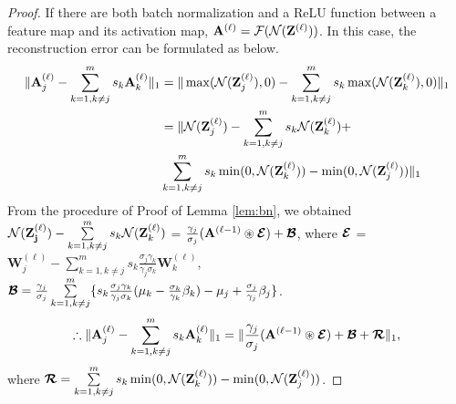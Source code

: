 \begin{proof}
If there are both batch normalization and a ReLU function between a feature map and its activation map, $\mathbf{A}^{(\ell)} = \mathcal{F}(\mathcal{N}(\mathbf{Z}^{(\ell)}))$. In this case, the reconstruction error can be formulated as below.
\small
\begin{eqnarray}
\begin{split}
 \|\mathbf{A}_{j}^{(\ell)}-\sum\limits_{k = 1, k \neq j}^{m}{s_{k}} \mathbf{A}_{k}^{(\ell)}\|_{1} &=\|\max(\mathcal{N}(\mathbf{Z}_{j}^{(\ell)}),0) - \sum\limits_{k=1, k \neq j}^{m} s_{k} \max(\mathcal{N}(\mathbf{Z}_{k}^{(\ell)}),0)\|_{1}\\
  &=\|\mathcal{N}(\mathbf{Z}_{j}^{(\ell)}) - \sum\limits_{k = 1, k \neq j}^{m}{s_{k}}\mathcal{N}(\mathbf{Z}_k^{(\ell)}) +\\
  &\sum\limits_{k=1, k \neq j}^{m} s_{k} \min(0,\mathcal{N}(\mathbf{Z}_{k}^{(\ell)})) - \min(0, \mathcal{N}(\mathbf{Z}_j^{(\ell)}))\|_{1}\\
\end{split}\nonumber
\end{eqnarray}
From the procedure of Proof of Lemma \ref{lem:bn}, we obtained $\mathcal{N}(\mathbf{Z_j^{(\ell)}}) - \sum\limits_{k = 1, k \neq j }^{m} s_{k} \mathcal{N}(\mathbf{Z}_k^{(\ell)}) $ = $\frac{\gamma_{j}}{\sigma_{j}}(\mathbf{A}^{(\ell-1)} \circledast \boldsymbol{\mathcal{E}}) + \boldsymbol{\mathcal{B}}$, where $\boldsymbol{\mathcal{E}}$ = $\mathbf{W}_j^{(\ell)} - \sum\limits_{k = 1, k \neq j}^{m}s_k\frac{\sigma_{j}\gamma_{k}}{\gamma_{j}\sigma_{k}}\mathbf{W}_k^{(\ell)} $, $\boldsymbol{\mathcal{B}} =\frac{\gamma_{j}}{\sigma_{j}}\sum\limits_{k = 1, k \neq j}^{m} \{s_k \frac{\sigma_{j}\gamma_{k}}{\gamma_{j}\sigma_{k}}(\mu_k - \frac{\sigma_{k}}{\gamma_{k}}\beta_k) - \mu_j +\frac{\sigma_{j}}{\gamma_{j}}\beta_j \}$.
\begin{equation}
    \therefore \|\mathbf{A}_{j}^{(\ell)}-\sum\limits_{k = 1, k \neq j}^{m}{s_{k}} \mathbf{A}_{k}^{(\ell)}\|_{1} = \|\frac{\gamma_{j}}{\sigma_{j}}(\mathbf{A}^{(\ell-1)} \circledast \boldsymbol{\mathcal{E}}) + \boldsymbol{\mathcal{B}} + \boldsymbol{\mathcal{R}} \|_{1},
    \nonumber
\end{equation}
where $\boldsymbol{\mathcal{R}} = \sum\limits_{k=1, k \neq j}^{m} s_{k}  \min(0,\mathcal{N}(\mathbf{Z}_{k}^{(\ell)}))-\min(0,\mathcal{N}(\mathbf{Z}_{j}^{(\ell)}))$.
\end{proof}

